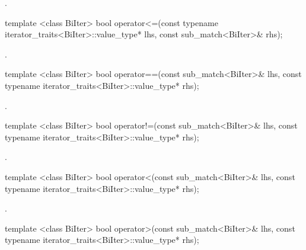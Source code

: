 \begin{itemdescr}
\pnum\returns {}.
\end{itemdescr}

%
\begin{itemdecl}
template <class BiIter>
  bool operator<=(const typename iterator_traits<BiIter>::value_type* lhs,
                  const sub_match<BiIter>& rhs);
\end{itemdecl}

\begin{itemdescr}
\pnum\returns {}.
\end{itemdescr}

%
\begin{itemdecl}
template <class BiIter>
  bool operator==(const sub_match<BiIter>& lhs,
                  const typename iterator_traits<BiIter>::value_type* rhs);
\end{itemdecl}

\begin{itemdescr}
\pnum\returns {}.
\end{itemdescr}

%
\begin{itemdecl}
template <class BiIter>
  bool operator!=(const sub_match<BiIter>& lhs,
                  const typename iterator_traits<BiIter>::value_type* rhs);
\end{itemdecl}

\begin{itemdescr}
\pnum\returns {}.
\end{itemdescr}

%
\begin{itemdecl}
template <class BiIter>
  bool operator<(const sub_match<BiIter>& lhs,
                 const typename iterator_traits<BiIter>::value_type* rhs);
\end{itemdecl}

\begin{itemdescr}
\pnum\returns {}.
\end{itemdescr}

%
\begin{itemdecl}
template <class BiIter>
  bool operator>(const sub_match<BiIter>& lhs,
                 const typename iterator_traits<BiIter>::value_type* rhs);
\end{itemdecl}

